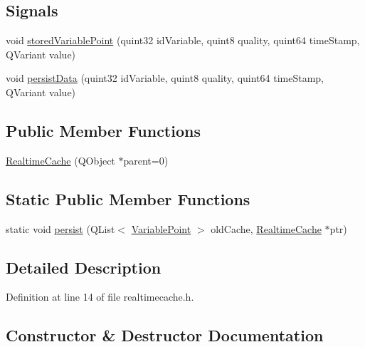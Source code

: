 \subsection*{Signals}
\begin{DoxyCompactItemize}
\item 
void \hyperlink{class_realtime_cache_a04c62588ca855639ffdbecdbaa4ef15b}{stored\+Variable\+Point} (quint32 id\+Variable, quint8 quality, quint64 time\+Stamp, Q\+Variant value)
\item 
void \hyperlink{class_realtime_cache_a0541d125e9bd27d84dab99f736039773}{persist\+Data} (quint32 id\+Variable, quint8 quality, quint64 time\+Stamp, Q\+Variant value)
\end{DoxyCompactItemize}
\subsection*{Public Member Functions}
\begin{DoxyCompactItemize}
\item 
\hyperlink{class_realtime_cache_a3ebe8bca670d6cce1e5540f244bd7dcb}{Realtime\+Cache} (Q\+Object $\ast$parent=0)
\end{DoxyCompactItemize}
\subsection*{Static Public Member Functions}
\begin{DoxyCompactItemize}
\item 
static void \hyperlink{class_realtime_cache_a872d780405651041da7396c515e411f8}{persist} (Q\+List$<$ \hyperlink{class_variable_point}{Variable\+Point} $>$ old\+Cache, \hyperlink{class_realtime_cache}{Realtime\+Cache} $\ast$ptr)
\end{DoxyCompactItemize}


\subsection{Detailed Description}


Definition at line 14 of file realtimecache.\+h.



\subsection{Constructor \& Destructor Documentation}
\hypertarget{class_realtime_cache_a3ebe8bca670d6cce1e5540f244bd7dcb}{}
